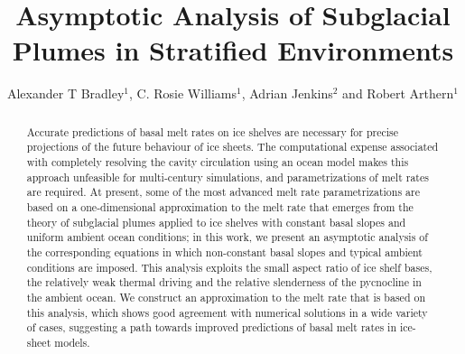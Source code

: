 \documentclass[openacc]{rsproca_new}%
\begin{document}
\title{Asymptotic Analysis of Subglacial Plumes in Stratified Environments}

\author{%
Alexander T Bradley$^{1}$, C. Rosie Williams$^{1}$, Adrian Jenkins$^{2}$ and Robert Arthern$^{1}$}

\address{$^{1}$British Antarctic Survey, High Cross, Madingley Road, Cambridge CB3 0ET, UK\\
$^{2}$Department of Geography and Environmental Sciences, Northumbria University, Newcastle upon Tyne, UK.}

\subject{xxxxx, xxxxx, xxxx}



\begin{abstract}
Accurate predictions of basal melt rates on ice shelves are necessary for precise projections of the future behaviour of ice sheets. The computational expense associated with completely resolving the cavity circulation using an ocean model makes this approach unfeasible for multi-century simulations, and parametrizations of melt rates are required. At present, some of the most advanced melt rate parametrizations are based on a one-dimensional approximation to the melt rate that emerges from the theory of subglacial plumes applied to ice shelves with constant basal slopes and uniform ambient ocean conditions; in this work, we present an asymptotic analysis of the corresponding equations in which non-constant basal slopes and typical ambient conditions are imposed. This analysis exploits the small aspect ratio of ice shelf bases, the relatively weak thermal driving and the relative slenderness of the pycnocline in the ambient ocean. We construct an approximation to the melt rate that is based on this analysis, which shows good agreement with numerical solutions in a wide variety of cases, suggesting a path towards improved predictions of basal melt rates in ice-sheet models.
\end{abstract}

\end{document}
